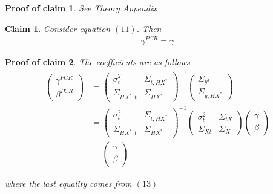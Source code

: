 \documentclass[10pt]{article}
\newtheorem{claim}{Claim}
\newtheorem{claimproof}{Proof of claim}[claim]
\begin{document}
\begin{claimproof}
See Theory Appendix
\end{claimproof}
 
\begin{claim}
Consider equation $(11)$. Then
\begin{align}
{\gamma}^{PCR} = \gamma
\end{align}
\end{claim}

\begin{claimproof}
The coefficients are as follows
        \begin{align}
            \left(\begin{array}{l}
        {\gamma}^{PCR} \\
        {\beta}^{PCR}
        \end{array}\right)&=\left(\begin{array}{cc}
        {\sigma}^2_{t} & \Sigma_{t,HX^*} \\
        \Sigma_{HX^*,t} & {\Sigma}_{HX^*}
        \end{array}\right)^{-1}\left(\begin{array}{c}
        \Sigma_{yt} \\
        \Sigma_{y,HX^*}
        \end{array}\right)\\
        &=\left(\begin{array}{cc}
        {\sigma}^2_{t} & \Sigma_{t,HX^*} \\
        \Sigma_{HX^*,t} & {\Sigma}_{HX^*}
        \end{array}\right)^{-1}\left(\begin{array}{cc}
        {\sigma}^2_{t} & \Sigma_{tX} \\
        \Sigma_{Xt} & {\Sigma}_{X}
        \end{array}\right)\left(\begin{array}{l}
        {\gamma} \\
        {\beta}
        \end{array}\right)\\
        &=\left(\begin{array}{l}
        {\gamma} \\
        {\beta}
        \end{array}\right)
        \end{align}
        
        where the last equality comes from $(13)$
\end{claimproof}
\end{document}
